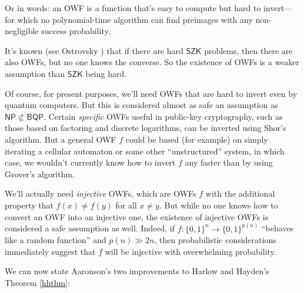\documentclass[12pt]{report}
\theoremstyle{plain}
\theoremstyle{definition}
\begin{document}
Or in words: an OWF is a function that's easy to compute but hard to invert---for which no polynomial-time algorithm can find preimages with any non-negligible success probability.

It's known (see Ostrovsky \cite{Ost91}) that if there are hard $\mathsf{SZK}$ problems, then there are also OWFs, but no one knows the converse.  So the existence of OWFs is a weaker assumption than $\mathsf{SZK}$ being hard.

Of course, for present purposes, we'll need OWFs that are hard to invert even by quantum computers.  But this is considered almost as safe an assumption as $\mathsf{NP}\not\subset \mathsf{BQP}$.  Certain {\em specific} OWFs useful in public-key cryptography, such as those based on factoring and discrete logarithms, can be inverted using Shor's algorithm.  But a general OWF $f$ could be based (for example) on simply iterating a cellular automaton or some other ``unstructured'' system, in which case, we wouldn't currently know how to invert $f$ any faster than by using Grover's algorithm.

We'll actually need {\em injective} OWFs, which are OWFs $f$ with the additional property that $f(x)\neq f(y)$ for all $x\neq y$.  But while no one knows how to convert an OWF into an injective one, the existence of injective OWFs is considered a safe assumption as well.  Indeed, if $f:\{0,1\}^n\longrightarrow \{0,1\}^{p(n)}$ ``behaves like a random function'' and $p(n) \gg 2n$, then probabilistic considerations immediately suggest that $f$ will be injective with overwhelming probability.

We can now state Aaronson's two improvements to Harlow and Hayden's Theorem \ref{hhthm}:
\end{document}
